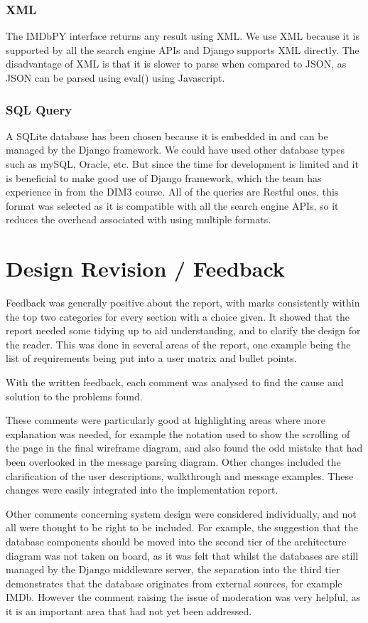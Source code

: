\documentclass{sig-alt-release2}
\begin{document}
\subsubsection*{XML}
The IMDbPY interface returns any result using XML. We use XML because it is supported by all the search engine APIs and Django supports XML directly. The disadvantage of XML is that it is slower to parse when compared to JSON, as JSON can be parsed using eval() using Javascript. 

\subsubsection*{SQL Query}
A SQLite database has been chosen because it is embedded in and can be managed by the Django framework. We could have used other database types such as mySQL, Oracle, etc. But since the time for development is  limited and it is beneficial to make good use of Django framework, which the team has experience in from the DIM3 course. All of the queries are Restful ones, this format was selected as it is compatible with all the search engine APIs, so it reduces the overhead associated with using multiple formats.


\section{Design Revision / Feedback}
Feedback was generally positive about the report, with marks consistently within the top two categories for every section with a choice given. It showed that the report needed some tidying up to aid understanding, and to clarify the design for the reader. This was done in several areas of the report, one example being the list of requirements being put into a user matrix and bullet points.

With the written feedback, each comment was analysed to find the cause and solution to the problems found.

These comments were particularly good at highlighting areas where more explanation was needed, for example the notation used to show the scrolling of the page in the final wireframe diagram, and also found the odd mistake that had been overlooked in the message parsing diagram. Other changes included the clarification of the user descriptions, walkthrough and message examples. These changes were easily integrated into the implementation report.

Other comments concerning system design were considered individually, and not all were thought to be right to be included. For example, the suggestion that the database components should be moved into the second tier of the architecture diagram was not taken on board, as it was felt that whilst the databases are still managed by the Django middleware server, the separation into the third tier demonstrates that the database originates from external sources, for example IMDb. However the comment raising the issue of moderation was very helpful, as it is an important area that had not yet been addressed.
\end{document}
